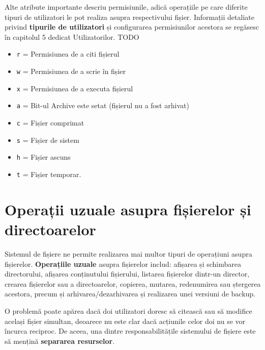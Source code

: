 Alte atribute importante descriu permisiunile, adică operațiile pe care diferite
tipuri de utilizatori le pot realiza asupra respectivului fișier. Informații
detaliate privind \textbf{tipurile de utilizatori} și configurarea permisiunilor
acestora se regăsesc în capitolul 5 dedicat Utilizatorilor. TODO


\begin{itemize}
	\item \texttt{r} = Permisiunea de a citi fișierul
	\item \texttt{w} = Permisiunea de a scrie în fișier
	\item \texttt{x} = Permisiunea de a executa fișierul
	\item \texttt{a} = Bit-ul Archive este setat (fișierul nu a fost arhivat)
	\item \texttt{c} = Fișier comprimat
	\item \texttt{s} = Fișier de sistem
	\item \texttt{h} = Fișier ascuns
	\item \texttt{t} = Fișier temporar.
\end{itemize}

\section{Operații uzuale asupra fișierelor și directoarelor}
\label{sec:file-system-file-ops}

Sistemul de fișiere ne permite realizarea mai multor tipuri de operațiuni asupra
fișierelor.  \textbf{Operațiile uzuale} asupra fișierelor includ: afișarea și
schimbarea directorului, afișarea conținutului fișierului, listarea fișierelor
dintr-un director, crearea fișierelor sau a directoarelor, copierea, mutarea,
redenumirea sau ștergerea acestora, precum și arhivarea/dezarhivarea și
realizarea unei versiuni de backup.

O problemă poate apărea dacă doi utilizatori doresc să citească sau să modifice
același fișier simultan, deoarece nu este clar dacă acțiunile celor doi nu se
vor încurca reciproc. De aceea, una dintre responsabilitățile sistemului de
fișiere este să mențină \textbf{separarea resurselor}.

